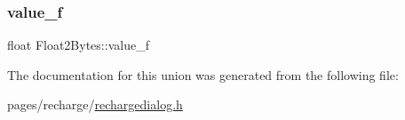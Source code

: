 \mbox{\label{union_float2_bytes_af2ad64a19825a68f71d1bff4fd320724}} 
\subsubsection{\texorpdfstring{value\_f}{value\_f}}
{\footnotesize\ttfamily float Float2\+Bytes\+::value\+\_\+f}



The documentation for this union was generated from the following file\+:\begin{DoxyCompactItemize}
\item 
pages/recharge/\mbox{\hyperlink{rechargedialog_8h}{rechargedialog.\+h}}\end{DoxyCompactItemize}
